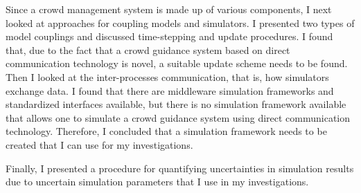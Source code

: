Since a crowd management system is made up of various components, I next looked at approaches for coupling models and simulators. I presented two types of model couplings and discussed time-stepping and update procedures. I found that, due to the fact that a crowd guidance system based on direct communication technology is novel, a suitable update scheme needs to be found. Then I looked at the inter-processes communication, that is, how simulators exchange data. I found that there are middleware simulation frameworks and standardized interfaces available, but there is no simulation framework available that allows one to simulate a crowd guidance system using direct communication technology. Therefore, I concluded that a simulation framework needs to be created that I can use for my investigations. 

Finally, I presented a procedure for quantifying uncertainties in simulation results due to uncertain simulation parameters that I use in my investigations.


